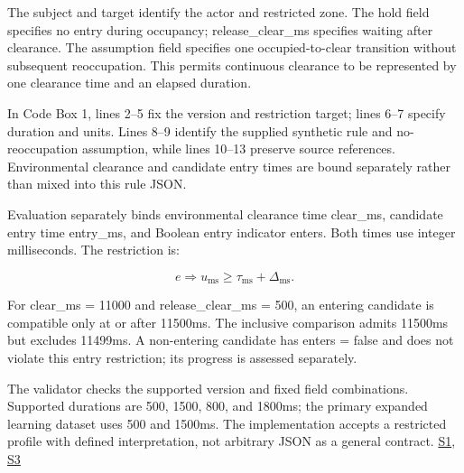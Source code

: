 \documentclass[nolineno]{ieeeaccess}
\begin{document}
The {\ttfamily{}\selectfont\footnotesize subject} and {\ttfamily{}\selectfont\footnotesize target} identify the actor and restricted zone. The {\ttfamily{}\selectfont\footnotesize hold} field specifies no entry during occupancy; {\ttfamily{}\selectfont\footnotesize release\_\allowbreak clear\_\allowbreak ms} specifies waiting after clearance. The {\ttfamily{}\selectfont\footnotesize assumption} field specifies one occupied-to-clear transition without subsequent reoccupation. This permits continuous clearance to be represented by one clearance time and an elapsed duration.\par

In Code Box 1, lines 2--5 fix the version and restriction target; lines 6--7 specify duration and units. Lines 8--9 identify the supplied synthetic rule and no-reoccupation assumption, while lines 10--13 preserve source references. Environmental clearance and candidate entry times are bound separately rather than mixed into this rule JSON.\par

Evaluation separately binds environmental clearance time {\ttfamily{}\selectfont\footnotesize clear\_\allowbreak ms}, candidate entry time {\ttfamily{}\selectfont\footnotesize entry\_\allowbreak ms}, and Boolean entry indicator {\ttfamily{}\selectfont\footnotesize enters}. Both times use integer milliseconds. The restriction is:\par

\[e\Rightarrow u_{\mathrm{ms}}\geq\tau_{\mathrm{ms}}+\Delta_{\mathrm{ms}}.\]

For {\ttfamily{}\selectfont\footnotesize clear\_\allowbreak ms = 11000} and {\ttfamily{}\selectfont\footnotesize release\_\allowbreak clear\_\allowbreak ms = 500}, an entering candidate is compatible only at or after 11500ms. The inclusive comparison admits 11500ms but excludes 11499ms. A non-entering candidate has {\ttfamily{}\selectfont\footnotesize enters = false} and does not violate this entry restriction; its progress is assessed separately.\par

The validator checks the supported version and fixed field combinations. Supported durations are 500, 1500, 800, and 1800ms; the primary expanded learning dataset uses 500 and 1500ms. The implementation accepts a restricted profile with defined interpretation, not arbitrary JSON as a general contract. \href{\detokenize{/home/jinhyun/prj_ws/prj_jin/guardsynth-cc/projects/04-guardsynth-coc/experiments/paper1_cnl_learning/temporal_preservation.py}}{S1}, \href{\detokenize{/home/jinhyun/prj_ws/prj_jin/guardsynth-cc/projects/04-guardsynth-coc/experiments/paper1_cnl_learning/temporal_training_data.py}}{S3}\par
\end{document}
